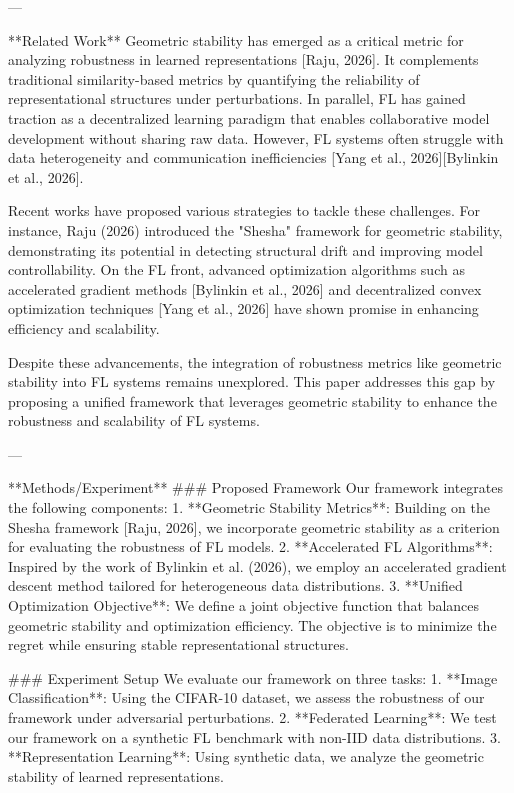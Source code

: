 ---

**Related Work**  
Geometric stability has emerged as a critical metric for analyzing robustness in learned representations [Raju, 2026]. It complements traditional similarity-based metrics by quantifying the reliability of representational structures under perturbations. In parallel, FL has gained traction as a decentralized learning paradigm that enables collaborative model development without sharing raw data. However, FL systems often struggle with data heterogeneity and communication inefficiencies [Yang et al., 2026][Bylinkin et al., 2026].

Recent works have proposed various strategies to tackle these challenges. For instance, Raju (2026) introduced the "Shesha" framework for geometric stability, demonstrating its potential in detecting structural drift and improving model controllability. On the FL front, advanced optimization algorithms such as accelerated gradient methods [Bylinkin et al., 2026] and decentralized convex optimization techniques [Yang et al., 2026] have shown promise in enhancing efficiency and scalability.

Despite these advancements, the integration of robustness metrics like geometric stability into FL systems remains unexplored. This paper addresses this gap by proposing a unified framework that leverages geometric stability to enhance the robustness and scalability of FL systems.

---

**Methods/Experiment**  
### Proposed Framework  
Our framework integrates the following components:  
1. **Geometric Stability Metrics**: Building on the Shesha framework [Raju, 2026], we incorporate geometric stability as a criterion for evaluating the robustness of FL models.  
2. **Accelerated FL Algorithms**: Inspired by the work of Bylinkin et al. (2026), we employ an accelerated gradient descent method tailored for heterogeneous data distributions.  
3. **Unified Optimization Objective**: We define a joint objective function that balances geometric stability and optimization efficiency. The objective is to minimize the regret while ensuring stable representational structures.

### Experiment Setup  
We evaluate our framework on three tasks:  
1. **Image Classification**: Using the CIFAR-10 dataset, we assess the robustness of our framework under adversarial perturbations.  
2. **Federated Learning**: We test our framework on a synthetic FL benchmark with non-IID data distributions.  
3. **Representation Learning**: Using synthetic data, we analyze the geometric stability of learned representations.

